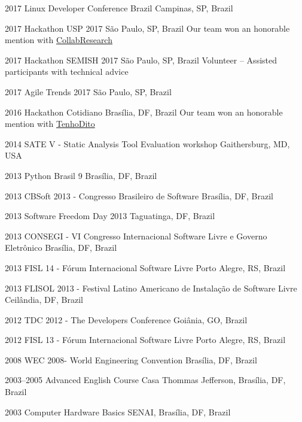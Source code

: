 \documentclass[print]{friggeri-cv}
\begin{document}
\begin{entrylist}


\entry
{2017}
{Linux Developer Conference Brazil}
{Campinas, SP, Brazil}
  {}

\entry
{2017}
{Hackathon USP 2017}
{São Paulo, SP, Brazil}
  {Our team won an honorable mention with \href{https://devpost.com/software/collab-research}{CollabResearch}}

\entry
{2017}
{Hackathon SEMISH 2017}
{São Paulo, SP, Brazil}
  {Volunteer -- Assisted participants with technical advice}

\entry
{2017}
{Agile Trends 2017}
{São Paulo, SP, Brazil}
  {}

\entry
{2016}
{Hackathon Cotidiano}
{Brasília, DF, Brazil}
  {Our team won an honorable mention with \href{https://github.com/tenhodito}{TenhoDito}}

\end{entrylist}
\begin{entrylist}

\entry
{2014}
{SATE V - Static Analysis Tool Evaluation workshop}
{Gaithersburg, MD, USA}
{}

\entry
{2013}
{Python Brasil 9}
{Brasília, DF, Brazil}
{}

\entry
{2013}
{CBSoft 2013 - Congresso Brasileiro de Software}
{Brasília, DF, Brazil}
{}

\entry
{2013}
{Software Freedom Day 2013}
{Taguatinga, DF, Brazil}
{}

\entry
{2013}
{CONSEGI - VI Congresso Internacional Software Livre e Governo Eletrônico}
{Brasília, DF, Brazil}
{}

\entry
{2013}
{FISL 14 - Fórum Internacional Software Livre}
{Porto Alegre, RS, Brazil}
{}

\entry
{2013}
{FLISOL 2013 - Festival Latino Americano de Instalação de Software Livre}
{Ceilândia, DF, Brazil}
{}

\entry
{2012}
{TDC 2012 - The Developers Conference}
{Goiânia, GO, Brazil}
{}

\entry
{2012}
{FISL 13 - Fórum Internacional Software Livre}
{Porto Alegre, RS, Brazil}
{}

\entry
{2008}
{WEC  2008- World Engineering Convention}
{Brasília, DF, Brazil}
{}

\entry
{2003--2005}
{Advanced English Course}
{Casa Thommas Jefferson, Brasília, DF, Brazil}
{}

\entry
{2003}
{Computer Hardware Basics}
{SENAI, Brasília, DF, Brazil}
{}

\end{entrylist}
\end{document}
